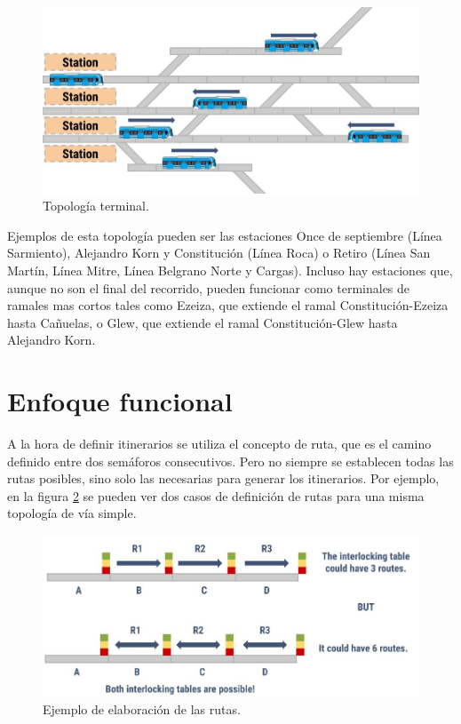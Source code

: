 			\begin{figure}[h]
			\centering
				\includegraphics[scale=.4]{./Figures/Terminal}
				\caption{Topología terminal.}
				\label{fig:Terminal}
			\end{figure}
		
		Ejemplos de esta topología pueden ser las estaciones Once de septiembre (Línea Sarmiento), Alejandro Korn y Constitución (Línea Roca) o Retiro (Línea San Martín, Línea Mitre, Línea Belgrano Norte y Cargas). Incluso hay estaciones que, aunque no son el final del recorrido, pueden funcionar como terminales de ramales mas cortos tales como Ezeiza, que extiende el ramal Constitución-Ezeiza hasta Cañuelas, o Glew, que extiende el ramal Constitución-Glew hasta Alejandro Korn.
							
\section{Enfoque funcional}
	\label{Incompletitud}
	
	A la hora de definir itinerarios se utiliza el concepto de ruta, que es el camino definido entre dos semáforos consecutivos. Pero no siempre se establecen todas las rutas posibles, sino solo las necesarias para generar los itinerarios. Por ejemplo, en la figura \ref{fig:EJ_Tabla} se pueden ver dos casos de definición de rutas para una misma topología de vía simple.
	
	\begin{figure}[h]
		\centering
			\includegraphics[scale=.4]{./Figures/Tablas}
			\caption{Ejemplo de elaboración de las rutas.}
			\label{fig:EJ_Tabla}
		\end{figure}
	

